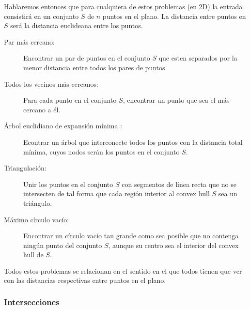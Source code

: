 \documentclass[final, 12pt letterpaper]{article}
\begin{document}
Hablaremos entonces que para cualquiera de estos problemas (en 2D) la entrada consistirá en un conjunto $S$ de $n$ puntos en el plano. La distancia entre puntos en $S$ será la distancia euclideana entre los puntos.

\begin{description}
\item[Par más cercano:]Encontrar un par de puntos en el conjunto $S$ que esten separados por la menor distancia entre todos los pares de puntos.

\item[Todos los vecinos más cercanos:] Para cada punto en el conjunto $S$, encontrar un punto que sea el más cercano a él.

\item[Árbol euclidiano de expansión mínima :] Econtrar un árbol que interconecte todos los puntos con la distancia total mínima, cuyos nodos serán los puntos en el conjunto $S$.

\item[Triangulación:] Unir los puntos en el conjunto $S$ con segmentos de línea recta que no se intersecten de tal forma que cada región interior al convex hull $S$ sea un triángulo.

\item[Máximo círculo vacío:] Encontrar un círculo vacío tan grande como sea posible que no contenga ningún punto del conjunto $S$, aunque su centro sea el interior del convex hull de $S$.

\end{description}

Todos estos problemas se relacionan en el sentido en el que todos tienen que ver con las distancias respectivas entre puntos en el plano.

\subsubsection{Intersecciones}
\end{document}
